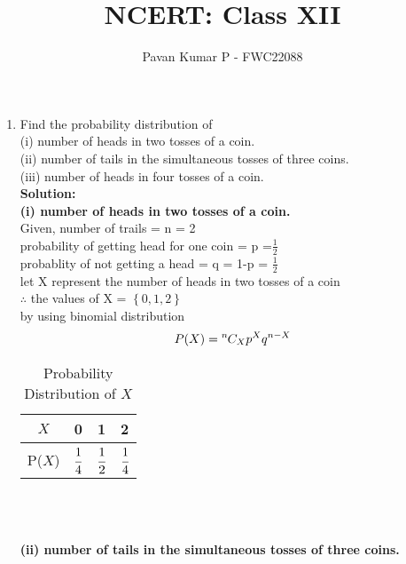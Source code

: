 \documentclass{article}
\providecommand{\cbrak}[1]{\ensuremath{\left\{#1\right\}}}
\newcommand{\solution}{\noindent \textbf{Solution: }}
\newcommand*{\permcomb}[4][0mu]{{{}^{#3}\mkern#1#2_{#4}}}
\newcommand*{\comb}[1][-1mu]{\permcomb[#1]{C}}
\newcommand\T{\rule{0pt}{2.6ex}}       %
\begin{document}
\title{NCERT: Class XII}
\author{\Large Pavan Kumar P - FWC22088}
\date{}

\maketitle

\begin{enumerate}[label=13.\arabic{enumi}.\arabic{enumii}]

\setcounter{enumi}{3}
\setcounter{enumii}{4}

\item Find the probability distribution of\\
(i) number of heads in two tosses of a coin.\\
(ii) number of tails in the simultaneous tosses of three coins.\\
(iii) number of heads in four tosses of a coin.\\[1ex]
\solution \\
\textbf{(i) number of heads in two tosses of a coin.\\}
Given, number of trails = n = 2\\
probability of getting head for one coin = p =$\frac{1}{2}$\\
probablity of not getting a head = q = 1-p = $\frac{1}{2}$\\
let X represent the number of heads in two tosses of a coin\\
$\therefore$ the values of X = \cbrak{0,1,2} \\
 by using binomial distribution\\
 \begin{align}
 P(X) = \comb{n}{X}p^Xq^{n-X}
 \end{align}
	\begin{table}[h]
	\normalsize
	\centering
			\begin{tabular}[20pt]{|c|c|c|c|} \hline		%
			$X$&0&1&2 \T \\ \hline
			P($X$)&$\cfrac{1}{4}$&$\cfrac{1}{2}$&$\cfrac{1}{4}$\\[1.5ex] \hline
		\end{tabular}\\[2ex]
		\caption{Probability Distribution of $X$}
	\end{table}\\
\textbf{(ii) number of tails in the simultaneous tosses of three coins.\\}

\end{enumerate}
\end{document}
